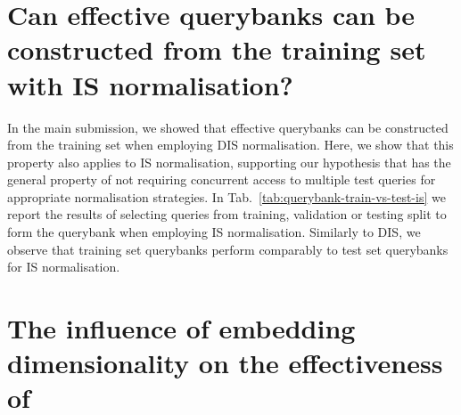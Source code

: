 \section{Can effective querybanks can be constructed from the training set with IS normalisation?}
\label{sec:effective-is}
\begin{table}
\begin{center}
\end{center}
\vspace{\spacebefore{}}
\caption{\textbf{Effective querybanks can be constructed
from the training set.}
Performance is reported on MSR-VTT
\texttt{full} split~\cite{xu2016msr} using IS normalisation.
We observe that a querybank of 60K samples from the training
set performs comparably to a test set querybank.
\label{tab:querybank-train-vs-test-is}}
\vspace{\spaceafter{}}
\end{table} In the main submission, we showed that effective querybanks can be constructed
from the training set when employing DIS normalisation.
Here, we show that this property also applies to IS normalisation,
supporting our hypothesis that \methodNameLong has the general property of not requiring
concurrent access to multiple test queries for appropriate normalisation
strategies.
In Tab.~\ref{tab:querybank-train-vs-test-is} we report the results of
selecting queries from training, validation or testing split to form
the querybank when employing IS normalisation.
Similarly to DIS, we observe that training set querybanks perform
comparably to test set querybanks for IS normalisation.

\section{The influence of embedding dimensionality on the effectiveness of \methodName}
\label{sec:embd-effect}

